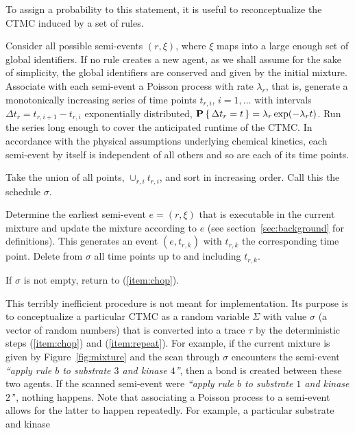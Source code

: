 To assign a probability to this statement, it is useful to
reconceptualize the CTMC induced by a set of rules.
\begin{inparaenum}[(i)]
\item \label{item:poisson} Consider all possible semi-events
  $(r, \xi)$, where $\xi$ maps into a large enough set of global
  identifiers. If no rule creates a new agent, as we shall assume for
  the sake of simplicity, the global identifiers are conserved and
  given by the initial mixture. Associate with each semi-event a
  Poisson process with rate $\lambda_r$, that is, generate a
  monotonically increasing series of time points $t_{r,i}$,
  $i=1,\ldots$ with intervals $\Delta t_r=t_{r,i+1}-t_{r,i}$
  exponentially distributed,
  $\mathbf{P} \left\{\, \Delta t_r=t \,\right\}=\lambda_r\exp(-\lambda_r t)$. Run the series
  long enough to cover the anticipated runtime of the CTMC. In
  accordance with the physical assumptions underlying chemical
  kinetics, each semi-event by itself is independent of all others and
  so are each of its time points.
\item \label{item:union} Take the union of all points,
  $\cup_{r,i}t_{r,i}$, and sort in increasing order. Call this the
  schedule $\sigma$.
\item \label{item:chop} Determine the earliest semi-event $e=(r, \xi)$
  that is executable in the current mixture and update the mixture
  according to $e$ (see section~\ref{sec:background} for
  definitions). This generates an event $(e, t_{r,k})$ with $t_{r,k}$
  the corresponding time point. Delete from $\sigma$ all time points
  up to and including $t_{r,k}$.
\item \label{item:repeat} If $\sigma$ is not empty, return to
  (\ref{item:chop}).
\end{inparaenum}
This terribly inefficient procedure is not meant for
implementation. Its purpose is to conceptualize a particular CTMC as a
random variable $\Sigma$ with value $\sigma$ (a vector of random
numbers) that is converted into a trace $\tau$ by the deterministic
steps (\ref{item:chop}) and (\ref{item:repeat}). For example, if the
current mixture is given by Figure~\ref{fig:mixture} and the scan
through $\sigma$ encounters the semi-event \emph{``apply rule $b$ to
  substrate $3$ and kinase $4$''}, then a bond is created between
these two agents. If the scanned semi-event were \emph{``apply rule
  $b$ to substrate $1$ and kinase $2$'}', nothing happens. Note that
associating a Poisson process to a semi-event allows for the latter to
happen repeatedly. For example, a particular substrate and kinase
